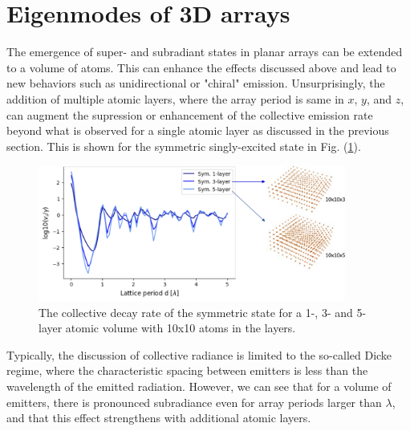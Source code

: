 \section{Eigenmodes of 3D arrays}
The emergence of super- and subradiant states in planar arrays can be extended to a volume of atoms. This can enhance the effects discussed above and lead to new behaviors such as unidirectional or "chiral" emission\cite{grankin2018free}. Unsurprisingly, the addition of multiple atomic layers, where the array period is same in $x$, $y$, and $z$, can augment the supression or enhancement of the collective emission rate beyond what is observed for a single atomic layer as discussed in the previous section. This is shown for the symmetric singly-excited state in Fig. (\ref{fig:superradiance_volumetric}).
\begin{figure}[!ht]
    \centering
    \includegraphics[width=0.9\textwidth]{Images/collective_radiance_in_volumetric_arrays.pdf}
    \caption{The collective decay rate of the symmetric state for a 1-, 3- and 5-layer atomic volume with 10x10 atoms in the layers.}
    \label{fig:superradiance_volumetric}
\end{figure}
Typically, the discussion of collective radiance is limited to the so-called Dicke regime, where the characteristic spacing between emitters is less than the wavelength of the emitted radiation. However, we can see that for a volume of emitters, there is pronounced subradiance even for array periods larger than $\lambda$, and that this effect strengthens with additional atomic layers. 





